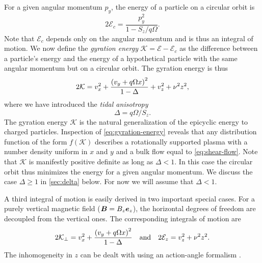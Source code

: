 \documentclass[aps,pre,notitlepage,amsmath,amssymb,amsfonts,nobibnotes,nofootinbib,superscriptaddress]{revtex4-1}
\begin{document}
For a given angular momentum $p_y$, the energy of a particle on a circular
orbit is
\begin{equation}
  2\mathcal{E}_c = \frac{p_y^2}{1 - S_z/q\Omega}.
\end{equation}
Note that $\mathcal{E}_c$ depends only on the angular momentum and is thus an
integral of motion. We now define the \emph{gyration energy}
$\mathcal{K}=\mathcal{E}-\mathcal{E}_c$ as the difference between a particle's
energy and the energy of a hypothetical particle with the same angular
momentum but on a circular orbit. The gyration energy is thus
\begin{equation}
  \label{eq:gyration-energy}
  2\mathcal{K} =
  v_x^2 + \frac{{(v_y + q\Omega x)}^2}{1-\Delta} + v_z^2 + \vfreq^2 z^2,
\end{equation}
where we have introduced the \emph{tidal anisotropy}
\begin{equation}
  \label{eq:tidal-anisotropy}
  \Delta = q\Omega/S_z.
\end{equation}
The gyration energy $\mathcal{K}$ is the natural generalization of the
epicyclic energy \citep{Shu1969} to charged particles. Inspection of
\cref{eq:gyration-energy} reveals that any distribution function of the form
$f(\mathcal{K})$ describes a rotationally supported plasma with a number
density uniform in $x$ and $y$ and a bulk flow equal to \cref{eq:shear-flow}.
Note that $\mathcal{K}$ is manifestly positive definite as long as $\Delta<1$.
In this case the circular orbit thus minimizes the energy for a given angular
momentum. We discuss the case $\Delta\ge1$ in \cref{sec:delta} below. For now
we will assume that $\Delta<1$.

A third integral of motion is easily derived in two important special cases.
For a purely vertical magnetic field ($\bm{B}=B_z\bm{e}_z$), the horizontal
degrees of freedom are decoupled from the vertical ones. The corresponding
integrals of motion are
\begin{equation}
  2\mathcal{K}_\perp =
  v_x^2 + \frac{{(v_y + q\Omega x)}^2}{1-\Delta}
  \quad\textrm{and}\quad
  2\mathcal{E}_z = v_z^2 + \nu^2 z^2.
\end{equation}
The inhomogeneity in $z$ can be dealt with using an action-angle formalism
\citep[e.g.][]{Kaufman1971,Kaufman1972}.
\end{document}
